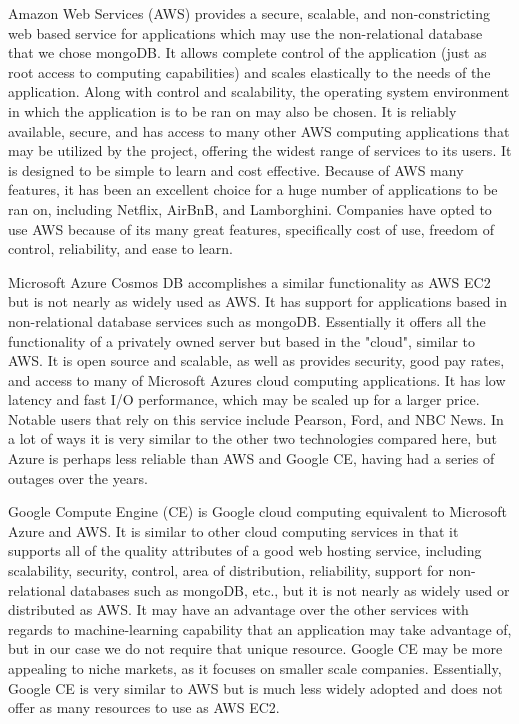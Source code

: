 	
		Amazon Web Services (AWS) provides a secure, scalable, and non-constricting web based service for applications which may use the non-relational database that we chose mongoDB. It allows complete control of the application (just as root access 
		to computing capabilities) and scales elastically to the needs of the application. Along with control and scalability, the operating system environment in which the application
		is to be ran on may also be chosen. It is reliably available, secure, and has access to many other AWS computing applications that may be utilized by the project, offering the widest
		range of services to its users. It is designed to be simple to learn and cost effective. Because of AWS many features, it has been an excellent choice for a huge number of applications to be ran on, including
		Netflix, AirBnB, and Lamborghini. Companies have opted to use AWS because of its many great features, specifically cost of use, freedom of control, reliability, and ease to learn. 
	
	
		Microsoft Azure Cosmos DB accomplishes a similar functionality as AWS EC2 but is not nearly as widely used as AWS. It has support for applications based in
		non-relational database services such as mongoDB. Essentially it offers all the functionality of a privately owned server but based in the "cloud", similar to AWS.
		It is open source and scalable, as well as provides security, good pay rates, and access to many of Microsoft Azures cloud computing applications. It has low latency and fast
		I/O performance, which may be scaled up for a larger price. Notable users that rely on this service include Pearson, Ford, and NBC News.  
		In a lot of ways it is very similar to the other two technologies compared here, but Azure is perhaps less reliable than AWS and Google CE, having had a series of outages over the years.
	
	
		Google Compute Engine (CE) is Google cloud computing equivalent to Microsoft Azure and AWS. It is similar to other cloud computing services in that it supports all of 
		the quality attributes of a good web hosting service, including scalability, security, control, area of distribution, reliability, support for non-relational databases
		such as mongoDB, etc., but it is not nearly as widely used or distributed as AWS. It may have an advantage over the other services with regards to machine-learning capability that an application
		may take advantage of, but in our case we do not require that unique resource. Google CE may be more appealing to niche markets, as it focuses on smaller scale companies.
		Essentially, Google CE is very similar to AWS but is much less widely adopted and does not offer as many resources to use as AWS EC2.
		
